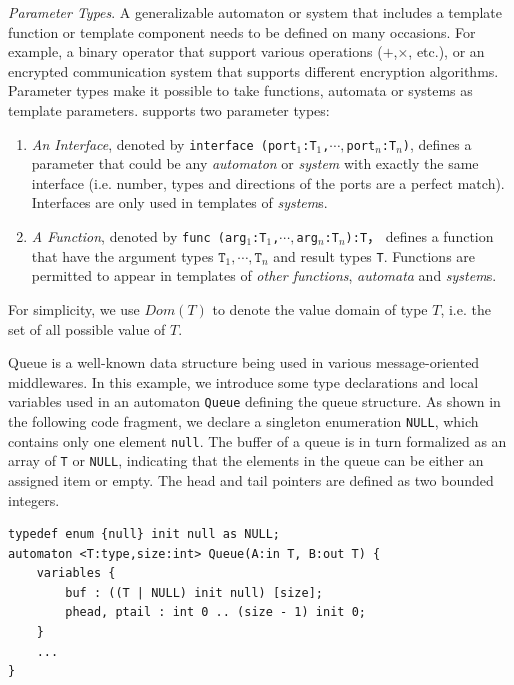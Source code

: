 \noindent\emph{Parameter Types}. A generalizable automaton or system that includes a template function or template component needs to be defined on many occasions. For example, a binary operator that support various operations ($+$,$\times$, etc.), or an encrypted communication system that supports different encryption algorithms. Parameter types make it possible to take functions, automata or systems as template parameters. \lang{} supports two parameter types: 
\begin{enumerate}
    \item \emph{An Interface}, denoted by \texttt{interface (port$_1$:T$_1$,$\cdots,$port$_n$:T$_n$)}, defines a parameter that could be any \emph{automaton} or \emph{system} with exactly the same interface (i.e. number, types and directions of the ports are a perfect match). Interfaces are only used in templates of \emph{system}s.
    \item \emph{A Function}, denoted by \texttt{func (arg$_1$:T$_1$,$\cdots, $arg$_n$:T$_n$):T}， defines a function that have the argument types $\texttt{T}_1,\cdots,\texttt{T}_n$ and result types \texttt{T}. Functions are permitted to appear in templates of \emph{other functions}, \emph{automata} and \emph{system}s.
\end{enumerate}

For simplicity, we use $Dom(T)$ to denote the value domain of type $T$, i.e. the set of all possible value of $T$.

\begin{example} Queue is a well-known data structure being used in various message-oriented middlewares. In this example, we introduce some type declarations and local variables used in an automaton \texttt{Queue} defining the queue structure. As shown in the following code fragment, we declare a singleton enumeration \texttt{NULL}, which contains only one element \texttt{null}. The buffer of a queue is in turn formalized as an array of \texttt{T} or \texttt{NULL}, indicating that the elements in the queue can be either an assigned item or empty. The head and tail pointers are defined as two bounded integers.
\begin{lstlisting}
typedef enum {null} init null as NULL;
automaton <T:type,size:int> Queue(A:in T, B:out T) {
    variables {
        buf : ((T | NULL) init null) [size];
        phead, ptail : int 0 .. (size - 1) init 0;
    }
    ...
}
\end{lstlisting}
\label{exp:typeinqueue}
\end{example}

